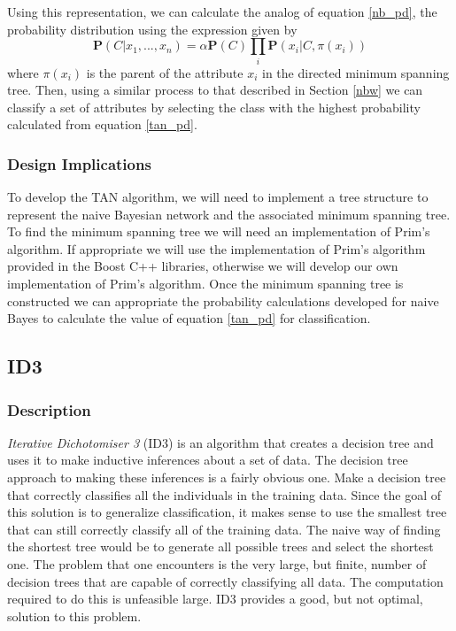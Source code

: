 \documentclass{article}
\newcommand{\ve}[1]{\boldsymbol{\mathbf{#1}}}
\begin{document}
				Using this representation, we can calculate the analog of equation \ref{nb_pd}, the probability distribution using the expression given by \cite{Zheng2010}
				\begin{equation}
						\ve{P}(C|x_1,...,x_n) = \alpha \ve{P}(C) \prod_i \ve{P}(x_i| C, \pi(x_i)) \label{tan_pd}
				\end{equation}
				where $\pi(x_i)$ is the parent of the attribute $x_i$ in the directed minimum spanning tree. Then, using a similar process to that described in Section \ref{nbw} we can classify a set of attributes by selecting the class with the highest probability calculated from equation \ref{tan_pd}.
			\subsubsection{Design Implications}
				To develop the TAN algorithm, we will need to implement a tree structure to represent the naive Bayesian network and the associated minimum spanning tree. To find the minimum spanning tree we will need an implementation of Prim's algorithm. If appropriate we will use the implementation of Prim's algorithm provided in the Boost C++ libraries, otherwise we will develop our own implementation of Prim's algorithm. Once the minimum spanning tree is constructed we can appropriate the probability calculations developed for naive Bayes to calculate the value of equation \ref{tan_pd} for classification.
		\subsection{ID3}
			\subsubsection{Description}
				\textit{Iterative Dichotomiser 3} (ID3) is an algorithm that creates a decision tree and uses it to make inductive inferences about a set of data.
				The decision tree approach to making these inferences is a fairly obvious one.
				Make a decision tree that correctly classifies all the individuals in the training data.
				Since the goal of this solution is to generalize classification, it makes sense to use the smallest tree that can still correctly classify all of the training data.
				The naive way of finding the shortest tree would be to generate all possible trees and select the shortest one\cite{Quinlan1986}.
				The problem that one encounters is the very large, but finite, number of decision trees that are capable of correctly classifying all data.
				The computation required to do this is unfeasible large.
				ID3 provides a good, but not optimal, solution to this problem.
		
\end{document}
